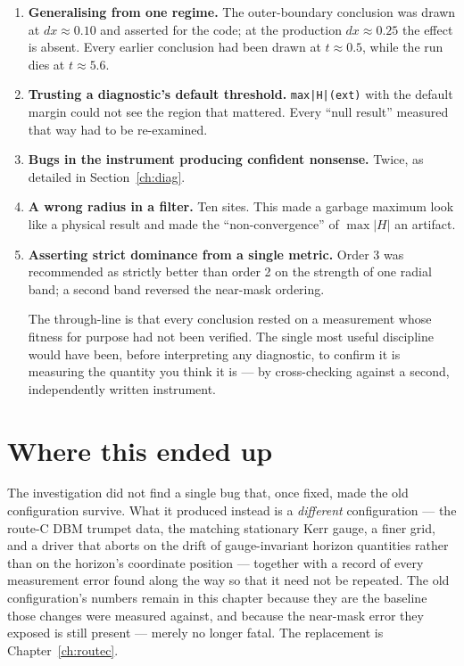 \documentclass[11pt,openany]{book}
\begin{document}
\begin{enumerate}
\item \textbf{Generalising from one regime.} The outer-boundary conclusion was
      drawn at $dx \approx 0.10$ and asserted for the code; at the production
      $dx \approx 0.25$ the effect is absent. Every earlier conclusion had
      been drawn at $t \approx 0.5$, while the run dies at $t \approx 5.6$.
\item \textbf{Trusting a diagnostic's default threshold.} \texttt{max|H|(ext)}
      with the default margin could not see the region that mattered. Every
      ``null result'' measured that way had to be re-examined.
\item \textbf{Bugs in the instrument producing confident nonsense.} Twice, as
      detailed in Section~\ref{ch:diag}.
\item \textbf{A wrong radius in a filter.} Ten sites. This made a garbage
      maximum look like a physical result and made the ``non-convergence'' of
      $\max|H|$ an artifact.
\item \textbf{Asserting strict dominance from a single metric.} Order 3 was
      recommended as strictly better than order 2 on the strength of one
      radial band; a second band reversed the near-mask ordering.

The through-line is that every conclusion rested on a measurement whose
fitness for purpose had not been verified. The single most useful discipline
would have been, before interpreting any diagnostic, to confirm it is measuring
the quantity you think it is --- by cross-checking against a second,
independently written instrument.
\end{enumerate}

\section{Where this ended up}

The investigation did not find a single bug that, once fixed, made the old
configuration survive. What it produced instead is a \emph{different}
configuration --- the route-C DBM trumpet data, the matching stationary Kerr
gauge, a finer grid, and a driver that aborts on the drift of gauge-invariant
horizon quantities rather than on the horizon's coordinate position ---
together with a record of every measurement error found along the way so that
it need not be repeated. The old configuration's numbers remain in this
chapter because they are the baseline those changes were measured against,
and because the near-mask error they exposed is still present --- merely no
longer fatal. The replacement is Chapter~\ref{ch:routec}.
\end{document}
